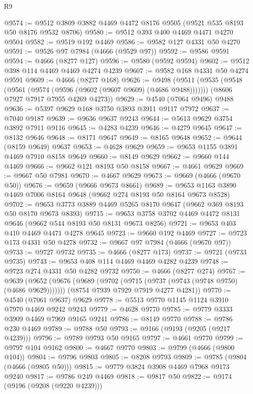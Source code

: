 \begin{lexlean}{R9}
\begin{coremodule}
@9574 := @9512 @3809 @3882 @4469 @4472 @8176 @9505 (@9521 @535 @8193 @50 @8176 @9532 @8706)
@9580 := @9512 @393 @400 @4469 @4471 @4270 @9504
@9582 := @9519 @192 @4469
@9586 := @9582 @127 @4331 @50 @4270
@9591 := @9526 @97 @7984 (@4666 (@9529 @97))
@9592 := @9586 @9591
@9594 := @4666 (@8277 @127)
@9596 := @9580 (@9592 @9594)
@9602 := @9512 @398 @114 @4469 @4469 @4274 @4239
@9607 := @9582 @168 @4331 @50 @4274 @9591
@9609 := @4666 (@8277 @168)
@9626 := @9498
    (@9511
      (@9535 (@9548 (@9561 (@9574 (@9596 (@9602 (@9607 @9609) (@4686 @9488)))))))
      (@8606 @7927 @7917 @7955 @4269 @4273))
@9629 := @4540 (@7064 @9496) @9488
@9636 := @5397 @9629 @168 @3750 @3893 @3911 @9117 @7972
@9637 := @7040 @9187
@9639 := @9636 @9637 @9243
@9644 := @5613 @9629 @3754 @3892 @7911 @9116
@9645 := @4283 @4239
@9646 := @4279 @9645
@9647 := @8132 @9646
@9648 := @8171 @9647
@9649 := @8165 @9648
@9652 := @9644 (@8159 @9649) @9637
@9653 := @4628 @9629
@9659 := @9653 @1155 @3891 @4469 @7910 @8158 @9649
@9660 := @8149 @9629
@9662 := @9660 @144 @4469
@9666 := @9662 @121 @8193 @50 @8158
@9667 := @4661 @9629
@9669 := @9667 @50 @7981
@9670 := @4667 @9629
@9673 := @9669 (@4666 (@9670 @50))
@9676 := @9659 (@9666 @9673 @8661)
@9689 := @9653 @1163 @3890 @4469 @7006 @8164 @9648 (@9662 @274 @8193 @50 @8164 @9673 @8528)
@9702 := @9653 @3773 @3889 @4469 @5265 @8170 @9647 (@9662 @369 @8193 @50 @8170 @9673 @8393)
@9715 := @9653 @3758 @3702 @4469 @4472 @8131 @9646 (@9662 @544 @8193 @50 @8131 @9673 @8256)
@9721 := @9653 @403 @410 @4469 @4471 @4278 @9645
@9723 := @9660 @192 @4469
@9727 := @9723 @173 @4331 @50 @4278
@9732 := @9667 @97 @7984 (@4666 (@9670 @97))
@9733 := @9727 @9732
@9735 := @4666 (@8277 @173)
@9737 := @9721 (@9733 @9735)
@9743 := @9653 @408 @114 @4469 @4469 @4282 @4239
@9748 := @9723 @274 @4331 @50 @4282 @9732
@9750 := @4666 (@8277 @274)
@9767 := @9639
    (@9652
      (@9676 (@9689 (@9702 (@9715 (@9737 (@9743 (@9748 @9750) (@4686 @9629)))))))
      (@8754 @7939 @7929 @7919 @4277 @4281))
@9770 := @4540 (@7061 @9637) @9629
@9778 := @5513 @9770 @1145 @1124 @3910 @7970 @4469 @9242 @9243
@9779 := @4628 @9770
@9785 := @9779 @3333 @3909 @4469 @7969 @9165 @9241
@9786 := @8149 @9770
@9788 := @9786 @230 @4469
@9789 := @9788 @50
@9793 := @9166 (@9193 (@9205 (@9217 @4239)))
@9796 := @9789 @9793 @50 @9165
@9797 := @4661 @9770
@9799 := @9797 @104 @9162
@9800 := @4667 @9770
@9803 := @9799 (@4666 (@9800 @104))
@9804 := @9796 @9803
@9805 := @8208 @9793
@9809 := @9785 (@9804 (@4666 (@9805 @50)))
@9815 := @9779 @3824 @3908 @4469 @7968 @9173 @9240
@9817 := @9786 @249 @4469
@9818 := @9817 @50
@9822 := @9174 (@9196 (@9208 (@9220 @4239)))

\end{coremodule}
\end{lexlean}

